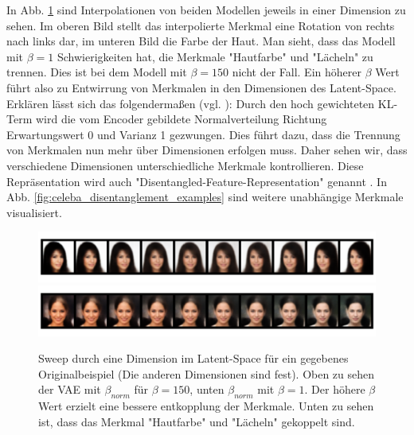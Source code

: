 In Abb. \ref{fig:celeba_disentangled} sind Interpolationen von beiden Modellen jeweils in einer Dimension zu sehen. Im oberen Bild stellt das interpolierte Merkmal eine Rotation von rechts nach links dar, im unteren Bild die Farbe der Haut. Man sieht, dass das Modell mit $\beta = 1$ Schwierigkeiten hat, die Merkmale "Hautfarbe" und "Lächeln" zu trennen. Dies ist bei dem Modell mit $\beta = 150$ nicht der Fall. Ein höherer $\beta$ Wert führt also zu Entwirrung von Merkmalen in den Dimensionen des Latent-Space. Erklären lässt sich das folgendermaßen (vgl. \cite{Higgins2017}): Durch den hoch gewichteten KL-Term wird die vom Encoder gebildete Normalverteilung Richtung Erwartungswert 0 und Varianz 1 gezwungen. Dies führt dazu, dass die Trennung von Merkmalen nun mehr über Dimensionen erfolgen muss. Daher sehen wir, dass verschiedene Dimensionen unterschiedliche Merkmale kontrollieren. Diese Repräsentation wird auch "Disentangled-Feature-Representation" genannt \cite{Higgins2017}. In Abb. \ref{fig:celeba_disentanglement_examples} sind weitere unabhängige Merkmale visualisiert.

\begin{figure}[hbt]
\centering
  \includegraphics[width=.9\textwidth]{gfx/evaluation/celeba/CelebA-Rotation_1}
  \includegraphics[width=.9\textwidth]{gfx/evaluation/celeba/regular-face-color}
  \caption{Sweep durch eine Dimension im Latent-Space für ein gegebenes Originalbeispiel (Die anderen Dimensionen sind fest). Oben zu sehen der VAE mit $\beta_{norm}$ für $\beta = 150$, unten $\beta_{norm}$ mit $\beta = 1$. Der höhere $\beta$ Wert erzielt eine bessere entkopplung der Merkmale. Unten zu sehen ist, dass das Merkmal "Hautfarbe" und "Lächeln" gekoppelt sind.}
  \label{fig:celeba_disentangled}
\end{figure}

